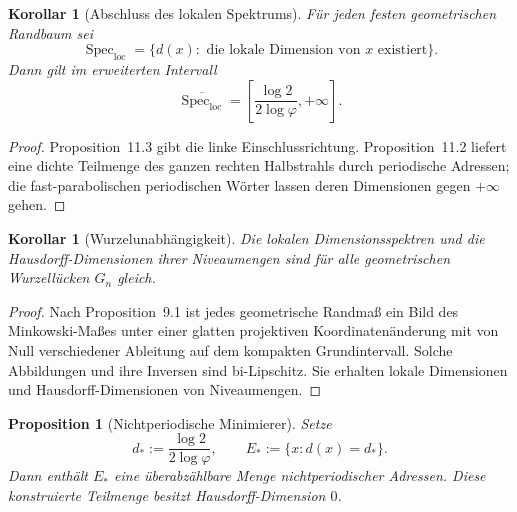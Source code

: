 \documentclass[11pt,a4paper]{article}
\newtheorem{proposition}[remark]{Proposition}
\newtheorem{corollary}[remark]{Korollar}
\begin{document}
\begin{corollary}[Abschluss des lokalen Spektrums]
Für jeden festen geometrischen Randbaum sei
\[
 \operatorname{Spec}_{\mathrm{loc}}
 =\{d(x):\text{ die lokale Dimension von }x\text{ existiert}\}.
\]
Dann gilt im erweiterten Intervall
\[
 \overline{\operatorname{Spec}_{\mathrm{loc}}}
 =\left[\frac{\log2}{2\log\varphi},+\infty\right].
\]
\end{corollary}

\begin{proof}
Proposition~11.3 gibt die linke Einschlussrichtung. Proposition~11.2
liefert eine dichte Teilmenge des ganzen rechten Halbstrahls durch
periodische Adressen; die fast-parabolischen periodischen Wörter lassen
deren Dimensionen gegen $+\infty$ gehen.
\end{proof}

\begin{corollary}[Wurzelunabhängigkeit]
Die lokalen Dimensionsspektren und die Hausdorff-Dimensionen ihrer
Niveaumengen sind für alle geometrischen Wurzellücken $G_n$ gleich.
\end{corollary}

\begin{proof}
Nach Proposition~9.1 ist jedes geometrische Randmaß ein Bild des
Minkowski-Maßes unter einer glatten projektiven Koordinatenänderung mit
von Null verschiedener Ableitung auf dem kompakten Grundintervall.
Solche Abbildungen und ihre Inversen sind bi-Lipschitz. Sie erhalten
lokale Dimensionen und Hausdorff-Dimensionen von Niveaumengen.
\end{proof}

\begin{proposition}[Nichtperiodische Minimierer]
Setze
\[
 d_*:=\frac{\log2}{2\log\varphi},
 \qquad E_*:=\{x:d(x)=d_*\}.
\]
Dann enthält $E_*$ eine überabzählbare Menge nichtperiodischer Adressen.
Diese konstruierte Teilmenge besitzt Hausdorff-Dimension $0$.
\end{proposition}
\end{document}

